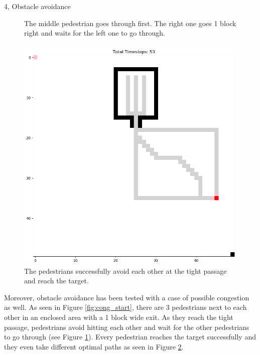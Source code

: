 \documentclass[10pt,a4paper]{article}
\begin{document}
\begin{task}{4, Obstacle avoidance}
\begin{figure}[h!]
    \caption{The middle pedestrian goes through first. The right one goes 1 block right and waits for the left one to go through.}
    \label{fig:cong_mid}
\end{figure}
\begin{figure}[h!]
    \centering
    \includegraphics[width=\textwidth]{pictures/end_task4_cong.PNG}
    \caption{The pedestrians successfully avoid each other at the tight passage and reach the target.}
    \label{fig:cong_end}
\end{figure}
Moreover, obstacle avoidance has been tested with a case of possible congestion as well. As seen in Figure \ref{fig:cong_start}, there are 3 pedestrians next to each other in an enclosed area with a 1 block wide exit. As they reach the tight passage, pedestrians avoid hitting each other and wait for the other pedestrians to go through (see Figure \ref{fig:cong_mid}). Every pedestrian reaches the target successfully and they even take different optimal paths as seen in Figure \ref{fig:cong_end}. \\
\end{task}
\end{document}

